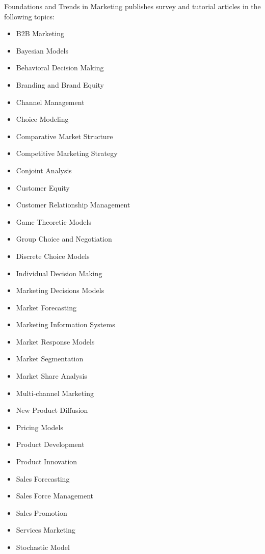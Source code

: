


\journalaimsandscope
 {%
  Foundations and Trends\textsuperscript{\textregistered} in
Marketing publishes
 survey and tutorial articles in the following topics: 
\begin{multicols}{2}\raggedcolumns
\begin{itemize}
\item{B2B Marketing}
\item{Bayesian Models}
\item{Behavioral Decision Making}
\item{Branding and Brand Equity}
\item{Channel Management}
\item{Choice Modeling}
\item{Comparative Market Structure}
\item{Competitive Marketing Strategy}
\item{Conjoint Analysis}
\item{Customer Equity}
\item{Customer Relationship Management}
\item{Game Theoretic Models}
\item{Group Choice and Negotiation}
\item{Discrete Choice Models}
\item{Individual Decision Making}
\item{Marketing Decisions Models}
\item{Market Forecasting}
\item{Marketing Information Systems}
\item{Market Response Models}
\item{Market Segmentation}
\item{Market Share Analysis}
\item{Multi-channel Marketing}
\item{New Product Diffusion}
\item{Pricing Models}
\item{Product Development}
\item{Product Innovation}
\item{Sales Forecasting}
\item{Sales Force Management}
\item{Sales Promotion}
\item{Services Marketing}
\item{Stochastic Model}
\end{itemize}
 \end{multicols}
 }

